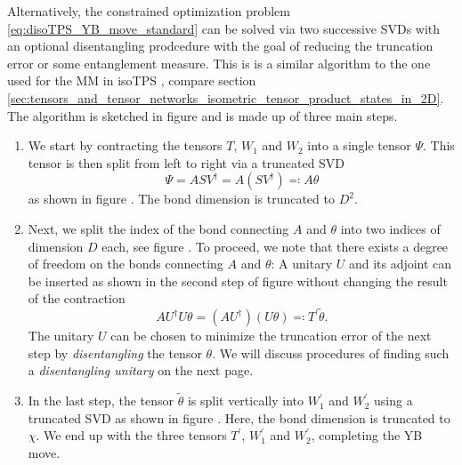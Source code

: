 Alternatively, the constrained optimization problem \eqref{eq:disoTPS_YB_move_standard} can be solved via two successive SVDs with an optional disentangling prodcedure with the goal of reducing the truncation error or some entanglement measure. This is is a similar algorithm to the one used for the MM in isoTPS \cite{cite:efficient_simulation_of_dynamics_in_two_dimensional_quantum_spin_systems}, compare section \ref{sec:tensors_and_tensor_networks_isometric_tensor_product_states_in_2D}. The algorithm is sketched in figure  and is made up of three main steps.
\begin{enumerate}
	\item We start by contracting the tensors $T$, $W_1$ and $W_2$ into a single tensor $\Psi$. This tensor is then split from left to right via a truncated SVD
	\begin{equation}
		\Psi = ASV^\dagger = A\left(SV^\dagger\right) \eqqcolon A\theta
	\end{equation}
	as shown in figure . The bond dimension is truncated to $D^2$.
	\item Next, we split the index of the bond connecting $A$ and $\theta$ into two indices of dimension $D$ each, see figure . To proceed, we note that there exists a degree of freedom on the bonds connecting $A$ and $\theta$: A unitary $U$ and its adjoint can be inserted as shown in the second step of figure  without changing the result of the contraction
	\begin{equation}
		AU^\dagger U\theta = \left(AU^\dagger\right)\left(U\theta\right) \eqqcolon T^\prime \tilde{\theta}.
	\end{equation}
	The unitary $U$ can be chosen to minimize the truncation error of the next step by \textit{disentangling} the tensor $\theta$. We will discuss procedures of finding such a \textit{disentangling unitary} on the next page.
	\item In the last step, the tensor $\tilde{\theta}$ is split vertically into $W_1^\prime$ and $W_2^\prime$ using a truncated SVD as shown in figure . Here, the bond dimension is truncated to $\chi$. We end up with the three tensors $T^\prime$, $W_1^\prime$ and $W_2^\prime$, completing the YB move.
\end{enumerate}

